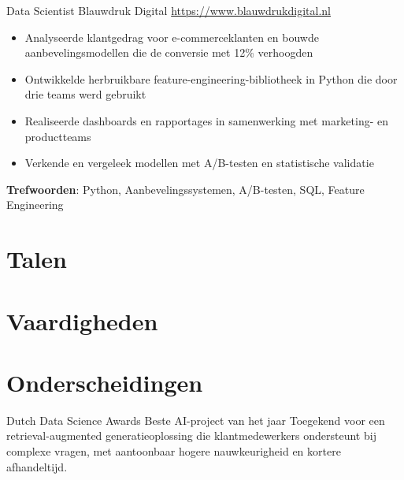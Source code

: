\documentclass[a4paper, serif, 10pt]{moderncv}
\begin{document}
        {Data Scientist}
        {Blauwdruk Digital}
        {\url{https://www.blauwdrukdigital.nl}}
        {}
        {\begin{itemize}
\item Analyseerde klantgedrag voor e-commerceklanten en bouwde aanbevelingsmodellen die de conversie met 12\% verhoogden
\item Ontwikkelde herbruikbare feature-engineering-bibliotheek in Python die door drie teams werd gebruikt
\item Realiseerde dashboards en rapportages in samenwerking met marketing- en productteams
\item Verkende en vergeleek modellen met A/B-testen en statistische validatie
\end{itemize}
\textbf{Trefwoorden}: Python, Aanbevelingssystemen, A/B-testen, SQL, Feature Engineering}
\section{Talen}

\section{Vaardigheden}

\section{Onderscheidingen}

        {Dutch Data Science Awards}
        {Beste AI-project van het jaar}
        {}
        {}
        {Toegekend voor een retrieval-augmented generatieoplossing die klantmedewerkers ondersteunt bij complexe vragen, met aantoonbaar hogere nauwkeurigheid en kortere afhandeltijd.}
\end{document}
